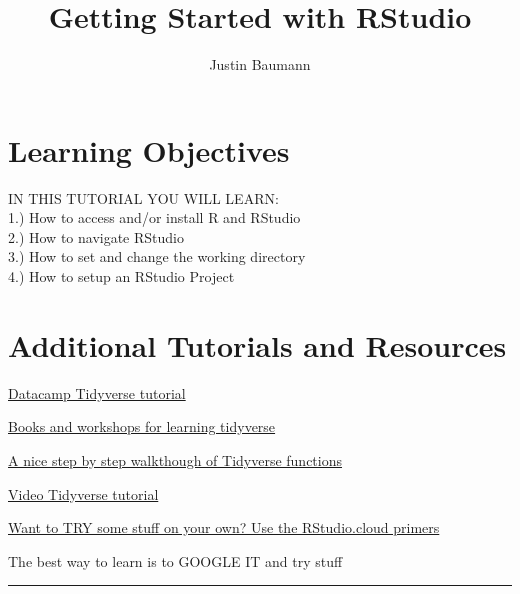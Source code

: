 \documentclass[
  letterpaper,
  DIV=11,
  numbers=noendperiod]{scrartcl}
\title{Getting Started with RStudio}
\author{Justin Baumann}
\date{}
\renewcommand*\contentsname{Table of contents}
\newcommand\contentsname{Table of contents}
\begin{document}
\maketitle
\ifdefined\Shaded\renewenvironment{Shaded}{\begin{tcolorbox}[sharp corners, frame hidden, boxrule=0pt, interior hidden, borderline west={3pt}{0pt}{shadecolor}, breakable, enhanced]}{\end{tcolorbox}}\fi

\renewcommand*\contentsname{Table of contents}
{
\hypersetup{linkcolor=}
\setcounter{tocdepth}{3}
\tableofcontents
}
\hypertarget{learning-objectives}{%
\section{\texorpdfstring{\textbf{Learning
Objectives}}{Learning Objectives}}\label{learning-objectives}}

IN THIS TUTORIAL YOU WILL LEARN:\\
1.) How to access and/or install R and RStudio\\
2.) How to navigate RStudio\\
3.) How to set and change the working directory\\
4.) How to setup an RStudio Project

\hypertarget{additional-tutorials-and-resources}{%
\section{Additional Tutorials and
Resources}\label{additional-tutorials-and-resources}}

\href{https://www.datacamp.com/community/tutorials/tidyverse-tutorial-r}{Datacamp
Tidyverse tutorial}

\href{https://www.tidyverse.org/learn/}{Books and workshops for learning
tidyverse}

\href{https://and.netlify.app/tutorials/02/}{A nice step by step
walkthough of Tidyverse functions}

\href{https://www.youtube.com/watch?v=JtQfXY0lIzc}{Video Tidyverse
tutorial}

\href{https://rstudio.cloud/learn/primers}{Want to TRY some stuff on
your own? Use the RStudio.cloud primers}

The best way to learn is to GOOGLE IT and try stuff

\begin{center}\rule{0.5\linewidth}{0.5pt}\end{center}
\end{document}
